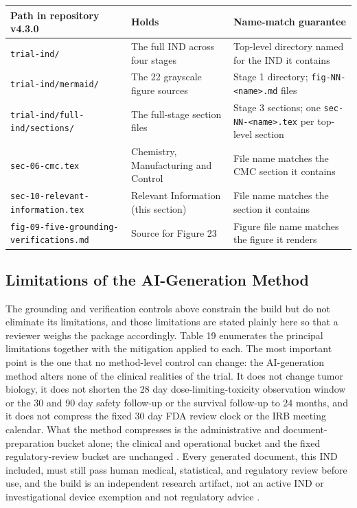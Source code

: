 \vspace{0.2em}
\noindent\begin{tabularx}{\textwidth}{L{4.6cm} L{4.2cm} Y}
\toprule
\textbf{Path in repository v4.3.0} & \textbf{Holds} & \textbf{Name-match guarantee} \\
\midrule
\texttt{trial-ind/} & The full IND across four stages & Top-level directory named for the IND it contains \\
\texttt{trial-ind/mermaid/} & The 22 grayscale figure sources & Stage 1 directory; \texttt{fig-NN-<name>.md} files \\
\texttt{trial-ind/full-ind/sections/} & The full-stage section files & Stage 3 sections; one \texttt{sec-NN-<name>.tex} per top-level section \\
\texttt{sec-06-cmc.tex} & Chemistry, Manufacturing and Control & File name matches the CMC section it contains \\
\texttt{sec-10-relevant-information.tex} & Relevant Information (this section) & File name matches the section it contains \\
\texttt{fig-09-five-grounding-verifications.md} & Source for Figure 23 & Figure file name matches the figure it renders \\
\bottomrule
\end{tabularx}

\subsection{Limitations of the AI-Generation Method}

The grounding and verification controls above constrain the build but do not
eliminate its limitations, and those limitations are stated plainly here so that a
reviewer weighs the package accordingly. Table 19 enumerates the principal
limitations together with the mitigation applied to each. The most important point
is the one that no method-level control can change: the AI-generation method alters
none of the clinical realities of the trial. It does not change tumor biology, it
does not shorten the 28 day dose-limiting-toxicity observation window or the 30 and
90 day safety follow-up or the survival follow-up to 24 months, and it does not
compress the fixed 30 day FDA review clock or the IRB meeting calendar. What the
method compresses is the administrative and document-preparation bucket alone; the
clinical and operational bucket and the fixed regulatory-review bucket are
unchanged \cite{phase1guidance, pdac060s2030}. Every generated document, this IND
included, must still pass human medical, statistical, and regulatory review before
use, and the build is an independent research artifact, not an active IND or
investigational device exemption and not regulatory advice
\cite{cfr312paiuni, cfr050paiuni}.

